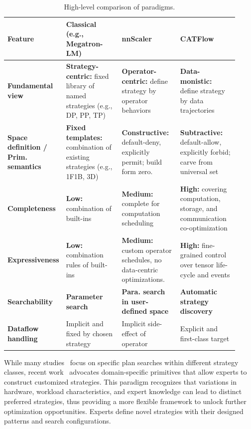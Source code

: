 \documentclass[letterpaper,twocolumn,10pt]{article}
\newcommand{\name}{CATFlow}
\begin{document}
\begin{table}[t!]
\small
\centering
\setlength{\tabcolsep}{4pt}
\caption{High-level comparison of paradigms.}
\label{tab:landscape}
\begin{tabular}{p{0.14\linewidth}p{0.26\linewidth}p{0.26\linewidth}p{0.26\linewidth}}
\toprule
\textbf{Feature} & \textbf{Classical} (e.g., Megatron-LM) & \textbf{nnScaler} & \textbf{\name{}} \\
\midrule
\textbf{Fundamental view} & \textbf{Strategy-centric:} fixed library of named strategies (e.g., DP, PP, TP) & \textbf{Operator-centric:} define strategy by operator behaviors & \textbf{Data-monistic:} define strategy by data trajectories \\
\textbf{Space definition / Prim. semantics} & \textbf{Fixed templates:} combination of existing strategies (e.g., 1F1B, 3D) & \textbf{Constructive:} default-deny, explicitly permit; build form zero. & \textbf{Subtractive:} default-allow, explicitly forbid; carve from universal set\\
\textbf{Completeness} & \textbf{Low:} combination of built-ins & \textbf{Medium:} complete for computation scheduling & \textbf{High:} covering computation, storage, and communication co-optimization \\
\textbf{Expressiveness} & \textbf{Low:} combination rules of built-ins & \textbf{Medium:} custom operator schedules, no data-centric optimizations. & \textbf{High:} fine-grained control over tensor life-cycle and events \\
\textbf{Searchability} & \textbf{Parameter search} & \textbf{Para. search in user-defined space} & \textbf{Automatic strategy discovery} \\
\textbf{Dataflow handling} & Implicit and fixed by chosen strategy & Implicit side-effect of operator & Explicit and first-class target \\
\bottomrule
\end{tabular}
\end{table}

While many studies~\cite{tarnawski2021piper, zheng2022alpa, liu2024aceso} focus on specific plan searches within different strategy classes, recent work~\cite{lin2024nnscaler, lin2024tessel} advocates domain-specific primitives that allow experts to construct customized strategies. This paradigm recognizes that variations in hardware, workload characteristics, and expert knowledge can lead to distinct preferred strategies, thus providing a more flexible framework to unlock further optimization opportunities. Experts define novel strategies with their designed patterns and search configurations.
\end{document}

